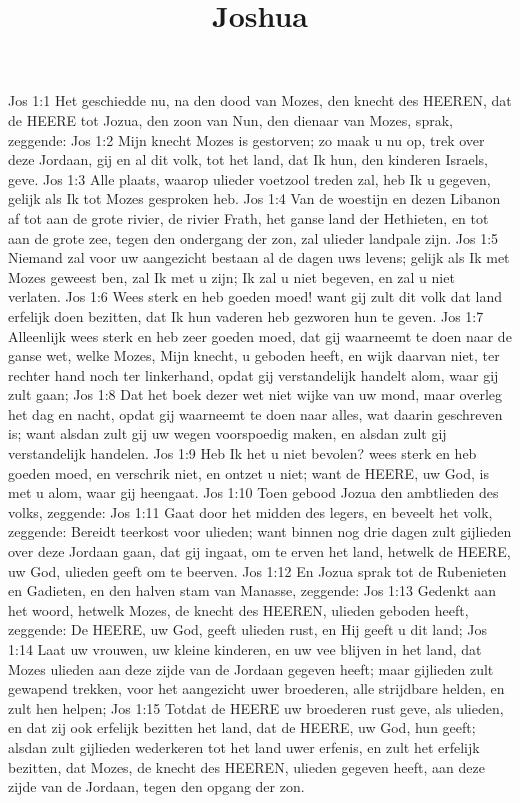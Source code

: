 

\title{Joshua}


Jos 1:1  Het geschiedde nu, na den dood van Mozes, den knecht des HEEREN, dat de HEERE tot Jozua, den zoon van Nun, den dienaar van Mozes, sprak, zeggende:
Jos 1:2  Mijn knecht Mozes is gestorven; zo maak u nu op, trek over deze Jordaan, gij en al dit volk, tot het land, dat Ik hun, den kinderen Israels, geve.
Jos 1:3  Alle plaats, waarop ulieder voetzool treden zal, heb Ik u gegeven, gelijk als Ik tot Mozes gesproken heb.
Jos 1:4  Van de woestijn en dezen Libanon af tot aan de grote rivier, de rivier Frath, het ganse land der Hethieten, en tot aan de grote zee, tegen den ondergang der zon, zal ulieder landpale zijn.
Jos 1:5  Niemand zal voor uw aangezicht bestaan al de dagen uws levens; gelijk als Ik met Mozes geweest ben, zal Ik met u zijn; Ik zal u niet begeven, en zal u niet verlaten.
Jos 1:6  Wees sterk en heb goeden moed! want gij zult dit volk dat land erfelijk doen bezitten, dat Ik hun vaderen heb gezworen hun te geven.
Jos 1:7  Alleenlijk wees sterk en heb zeer goeden moed, dat gij waarneemt te doen naar de ganse wet, welke Mozes, Mijn knecht, u geboden heeft, en wijk daarvan niet, ter rechter hand noch ter linkerhand, opdat gij verstandelijk handelt alom, waar gij zult gaan;
Jos 1:8  Dat het boek dezer wet niet wijke van uw mond, maar overleg het dag en nacht, opdat gij waarneemt te doen naar alles, wat daarin geschreven is; want alsdan zult gij uw wegen voorspoedig maken, en alsdan zult gij verstandelijk handelen.
Jos 1:9  Heb Ik het u niet bevolen? wees sterk en heb goeden moed, en verschrik niet, en ontzet u niet; want de HEERE, uw God, is met u alom, waar gij heengaat.
Jos 1:10  Toen gebood Jozua den ambtlieden des volks, zeggende:
Jos 1:11  Gaat door het midden des legers, en beveelt het volk, zeggende: Bereidt teerkost voor ulieden; want binnen nog drie dagen zult gijlieden over deze Jordaan gaan, dat gij ingaat, om te erven het land, hetwelk de HEERE, uw God, ulieden geeft om te beerven.
Jos 1:12  En Jozua sprak tot de Rubenieten en Gadieten, en den halven stam van Manasse, zeggende:
Jos 1:13  Gedenkt aan het woord, hetwelk Mozes, de knecht des HEEREN, ulieden geboden heeft, zeggende: De HEERE, uw God, geeft ulieden rust, en Hij geeft u dit land;
Jos 1:14  Laat uw vrouwen, uw kleine kinderen, en uw vee blijven in het land, dat Mozes ulieden aan deze zijde van de Jordaan gegeven heeft; maar gijlieden zult gewapend trekken, voor het aangezicht uwer broederen, alle strijdbare helden, en zult hen helpen;
Jos 1:15  Totdat de HEERE uw broederen rust geve, als ulieden, en dat zij ook erfelijk bezitten het land, dat de HEERE, uw God, hun geeft; alsdan zult gijlieden wederkeren tot het land uwer erfenis, en zult het erfelijk bezitten, dat Mozes, de knecht des HEEREN, ulieden gegeven heeft, aan deze zijde van de Jordaan, tegen den opgang der zon.
